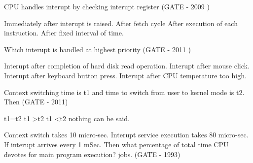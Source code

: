 \begin{questyle}

  \question CPU handles interupt by checking interupt register (GATE - 2009 )

  \begin{choices}
    \choice Immediately after interupt is raised.
    \choice After fetch cycle
    \choice After execution of each instruction.
    \choice After fixed interval of time.
  \end{choices}

  \end{questyle}




\begin{questyle}

  \question Which interupt is handled at highest priority (GATE - 2011 )

  \begin{choices}
    \choice Interupt after completion of hard disk read operation.
    \choice Interupt after mouse click.
    \choice Interupt after keyboard button press.
    \choice Interupt after CPU temperature too high.
  \end{choices}

  \end{questyle}





\begin{questyle}

  \question Context switching time is t1 and time to switch from user to kernel mode is t2. Then (GATE - 2011)

  \begin{oneparchoices}
    \choice t1=t2
    \choice t1 \textgreater  t2
    \choice t1 \textless  t2
    \choice nothing can be said.
  \end{oneparchoices}


  \end{questyle}




\begin{questyle}

  \question Context switch takes 10 micro-sec. Interupt service execution takes  80 micro-sec. If interupt arrives every 1 mSec.
            Then what percentage of total time CPU devotes for main program execution?  jobs. (GATE - 1993)

  \end{questyle}



